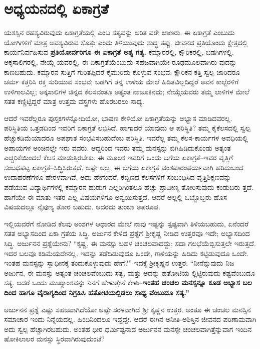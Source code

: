 
\chapter{ಅಧ್ಯಯನದಲ್ಲಿ ಏಕಾಗ್ರತೆ}

ಯಶಸ್ಸಿನ ರಹಸ್ಯವಿರುವುದು ಏಕಾಗ್ರತೆಯಲ್ಲಿ ಎಂಬ ಸತ್ಯವನ್ನು ಅರಿತ ವರೇ ಜಾಣರು. ಈ ಏಕಾಗ್ರತೆ ಎಂಬುದು ಯೋಗಿಗಳಿಗೆ ಮಾತ್ರ ಅವಶ್ಯವಿರುವ ಸೊತ್ತು ಎಂದು ತಿಳಿಯುವುದು ಶುದ್ಧ ತಪ್ಪು. ಜೀವನದ ಪ್ರತಿಯೊಂದು ಕ್ಷೇತ್ರದಲ್ಲಿ ಕಾರ್ಯನಿರ್ವಹಿಸುವ \textbf{ಪ್ರತಿಯೋರ್ವರಿಗೂ ಈ ಏಕಾಗ್ರತೆ ಅತ್ಯ ಗತ್ಯ.} ಕಮ್ಮಾರರಲ್ಲಿ, ಕ್ಷೌರಿಕರಲ್ಲಿ, ಬಡಗಿಗಳಲ್ಲಿ, ಅಕ್ಕಸಾಲಿಗರಲ್ಲಿ, ನೇಯ್ಗೆ ಯವರಲ್ಲಿ, ಈ ಏಕಾಗ್ರತೆಯೆಂಬುದು ಸಹಜವಾಗಿಯೇ ರೂಢಮೂಲವಾಗಿರು ವುದನ್ನು ಕಾಣಬಹುದು. ಕಮ್ಮಾರನ ಸುತ್ತಿಗೆ ಗುರಿತಪ್ಪಿದರೆ ಕೈಮುರಿದು ಕೊಳ್ಳುವ ಸಂಭವ; ಕ್ಷೌರಿಕನ ಕತ್ತಿ ಸ್ವಲ್ಪ ಜಾರಿದರೂ ಚರ್ಮ ಕತ್ತರಿಸಿ ರಕ್ತ ಸುರಿಯುವ ಸಂಭವ; ಬಡಗಿಗೆ ತನ್ನ ಉಳಿಯ ಮೇಲೆ ಹಿಡಿತವಿಲ್ಲದಿದ್ದರೆ ಅವನ ಕಾಲ್ಬೆರಳಿಗೆ ಉಳಿಗಾಲವಿಲ್ಲ; ಅಕ್ಕಸಾಲಿಗಳ ಚಿನ್ನದ ಕೆಲಸವಂತೂ ಅತ್ಯಂತ ನಾಜೂಕಿನದು; ನೇಯ್ಗೆಯವರು ತಮ್ಮ ಲಾಳಿಗಳ ಮೇಲೆ ಸತತ ಕಣ್ಣಿಟ್ಟಿದ್ದರೆ ಮಾತ್ರ ಉತ್ತಮ ವಸ್ತ್ರಗಳು ಹೊರಬರಲು ಸಾಧ್ಯ.

ಆದರೆ ಇವರೆಲ್ಲರೂ ಪುಸ್ತಕಗಳನ್ನೋದಿಯೋ, ಭಾಷಣ ಕೇಳಿಯೋ ಏಕಾಗ್ರತೆಯನ್ನು ಅಭ್ಯಾಸ ಮಾಡಿದವರಲ್ಲ. ಪರಿಸ್ಥಿತಿಯ ಒತ್ತಡದಿಂದ ಇವರಿಗೆ ಏಕಾಗ್ರತೆ ಲಭಿಸಿದೆ. ಹಾಗಾದರೆ ಯಾವುದು ಆ ಪರಿಸ್ಥಿತಿ? ತಮ್ಮ ಕೈಕೆಲಸದಲ್ಲಿ ಸ್ವಲ್ಪ ಹೆಚ್ಚುಕಡಿಮೆಯಾದರೂ ಅಪಘಾತ ಸಂಭವಿಸಬಹುದೆಂಬ ಪರಿಸ್ಥಿತಿ. ಇವರೆಲ್ಲ ತಮ್ಮ ಕೆಲಸ-ಕಾರ್ಯಗಳ ಅವಧಿಯಲ್ಲಿ ಅಪಾಯಗಳ ಅಂಚಿನಲ್ಲೇ ಇರು ವವರು. ಆದ್ದರಿಂದ ಇವರು ತಮ್ಮ ಮನಸ್ಸನ್ನು ಬಿಗಿಹಿಡಿದುಕೊಂಡು ಅತ್ಯಂತ ಎಚ್ಚರಿಕೆಯಿಂದಲೆ ಕೆಲಸ ಮಾಡುತ್ತಿರಬೇಕು. ಈ ಮೂಲಕ ಇವರಿಗೆ ಒಂದು ಬಗೆಯ ಏಕಾಗ್ರತೆ–ಇವರ ವೃತ್ತಿಗೆ ಸಂಬಧಪಟ್ಟ ಏಕಾಗ್ರತೆ–ಸಿದ್ಧಿಸಿರುತ್ತದೆ. ಅಷ್ಟೇ ಅಲ್ಲ, ಈ ಬಗೆಯ ಏಕಾಗ್ರತೆ ವಂಶಪಾರಂಪರ್ಯವಾಗಿ ಹರಿದುಬಂದ ಉದಾಹರಣೆಗಳೂ ಹೇರಳವಾಗಿವೆ. ಅದು ಹೇಗೆಂದರೆ, ಕಬ್ಬಿಣದ ಕೆಲಸಗಳಿಗೆ ಸಂಬಂಧಿಸಿದ ವೃತ್ತಿಶಿಕ್ಷಣವನ್ನು ಪಡೆಯುವ ವಿದ್ಯಾರ್ಥಿಗಳಲ್ಲಿ ಕಮ್ಮಾರನ ಹುಡುಗ ಎಲ್ಲರಿಗಿಂತಲೂ ಹೆಚ್ಚು ಪ್ರಾವೀಣ್ಯ ತೋರಿಸುವುದು ಕಂಡುಬರು ತ್ತದೆ. ಹಾಗೆಯೇ ಈ ಮಾತು ಇತರ ಎಲ್ಲ ವಿಷಯಗಳಿಗೂ ಅನ್ವಯಿಸುತ್ತದೆ. ಆದರೆ ಅಲ್ಲಲ್ಲಿ ಒಬ್ಬೊಬ್ಬರು ಹೊಸ ವಿಷಯದಲ್ಲೂ ನೈಪುಣ್ಯ ತೋರ ಬಹುದು. ಆದರದು ತುಂಬಾ ಅಪರೂಪ.

ಇಲ್ಲಿಯವರೆಗೆ ನೋಡಿದ ಕೆಲವು ಅಂಶಗಳ ಆಧಾರದ ಮೇಲೆ ನಾವು ಇಷ್ಟನ್ನು ಸ್ಪಷ್ಟವಾಗಿ ತಿಳಿಯಬಹುದು, ಏನೆಂದರೆ ಸತತ ಅಭ್ಯಾಸದಿಂದ ಏಕಾ ಗ್ರತೆಯ ಸಿದ್ಧಿ. ಅರ್ಜುನ ಕೇಳಿದ ಪ್ರಶ್ನೆಗೆ ಶ್ರೀಕೃಷ್ಣ ನೀಡಿದ ಉತ್ತರವೂ ಇದೇ; ಅಭ್ಯಾಸದಿಂದ ಸಿದ್ಧಿ. ಅರ್ಜುನನ ಪ್ರಶ್ನೆಯೇನು? “ಕೃಷ್ಣ, ಈ ಮನಸ್ಸು ಬಹಳ ಚಂಚಲವಾದದ್ದು; ಸದಾ ಗಲಭೆಯೆಬ್ಬಿಸುತ್ತಲೇ ಇರುತ್ತದೆ. ಇದರ ಬಲವೂ ಕಡಿಮೆಯದೇನಲ್ಲ. ಇದನ್ನು ತಡೆದಿಡುವುದೂ ಒಂದೇ, ಗಾಳಿಯನ್ನು ಹಿಡಿದು ಕಟ್ಟಿಡುವುದೂ ಒಂದೇ. ಇಂತಹ ಮನಸ್ಸನ್ನು ಸ್ವಾಧೀನಕ್ಕೆ ತಂದುಕೊಳ್ಳುವುದು ಹೇಗೆ?” ಇದಕ್ಕೆ ಶ್ರೀಕೃಷ್ಣನ ಉತ್ತರ: “ನೀನೆನ್ನುವುದು ನಿಜ ಅರ್ಜುನ, ಈ ಮನಸ್ಸು ಅತ್ಯಂತ ಚಂಚಲವೆಂಬುದು ಸತ್ಯ, ಮತ್ತು ಅದನ್ನು ಹತೋಟಿಯ ಲ್ಲಿಟ್ಟಿರುವುದು ಕಷ್ಟವೆಂಬುದೂ ಸತ್ಯ. ಆದರೆ ಒಂದು ಮುಖ್ಯಾಂಶವನ್ನು ನಿನಗೆ ಹೇಳುತ್ತೇನೆ ಕೇಳು–\textbf{ಇಂತಹ ಚಂಚಲ ಮನಸ್ಸನ್ನೂ ಕೂಡ ಅಭ್ಯಾಸ ಬಲ ದಿಂದ ಹಾಗೂ ವೈರಾಗ್ಯದಿಂದ ನಿಗ್ರಹಿಸಿ ಹತೋಟಿಯಲ್ಲಿಡಲು ಸಾಧ್ಯ ವೆಂಬುದೂ ಸತ್ಯ.”}

ಅರ್ಜುನನ ಪ್ರಶ್ನೆ ಎಷ್ಟು ಸಹಜವಾಗಿದೆಯೋ ಅಷ್ಟೇ ಸರಳವಾಗಿದೆ ಶ್ರೀ ಕೃಷ್ಣನ ಉತ್ತರ. ಅಂತೂ ಈ ಚಂಚಲ ಮನಸ್ಸಿನ ಸಮಾಚಾರ ಇಂದು ನಿನ್ನೆಯದಲ್ಲ. ಹಿಂದಿನಿಂದಲೂ ಇದ್ದದ್ದೇ. ಆದರೆ ಈಗಿನ ಅನೀತಿ-ಅಶಿಸ್ತಿನ ಜೀವನದ ಪರಿಣಾಮವಾಗಿ ಅದು ಸ್ವಲ್ಪ ಹೆಚ್ಚಾಗಿರಬಹುದು. ಅಂತಹ ಧೀರ ಧರ್ಮಿಷ್ಟನಾದ ಅರ್ಜುನನ ಮನಸ್ಸೇ ಚಂಚಲವಾಗಿತ್ತೆನ್ನುವಾಗ ಇಂದಿನ ಷೋಕಿಲಾಲರ ಮನಸ್ಸು ಸ್ಥಿರವಾಗಿರುವುದುಂಟೆ?

